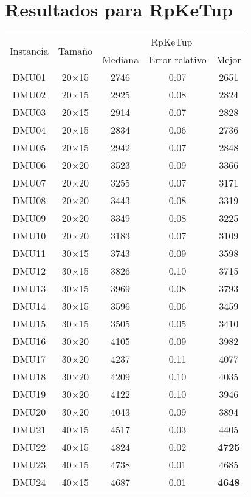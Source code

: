 \section{Resultados para RpKeTup}

\begin{table}[H]
\centering
\begin{tabular}{@{}ccccc@{}}
\toprule
\multirow{2}{*}{Instancia} & \multirow{2}{*}{Tamaño} & \multicolumn{3}{c}{RpKeTup} \\ \cmidrule(lr){3-5}
& & Mediana& Error relativo & Mejor  \\ \midrule
DMU01 & 20$\times$15 & 2746 & 0.07 & 2651\\ 
DMU02 & 20$\times$15 & 2925 & 0.08 & 2824\\ 
DMU03 & 20$\times$15 & 2914 & 0.07 & 2828\\ 
DMU04 & 20$\times$15 & 2834 & 0.06 & 2736\\ 
DMU05 & 20$\times$15 & 2942 & 0.07 & 2848\\ 
DMU06 & 20$\times$20 & 3523 & 0.09 & 3366\\ 
DMU07 & 20$\times$20 & 3255 & 0.07 & 3171\\ 
DMU08 & 20$\times$20 & 3443 & 0.08 & 3319\\ 
DMU09 & 20$\times$20 & 3349 & 0.08 & 3225\\ 
DMU10 & 20$\times$20 & 3183 & 0.07 & 3109\\ 
DMU11 & 30$\times$15 & 3743 & 0.09 & 3598\\ 
DMU12 & 30$\times$15 & 3826 & 0.10 & 3715\\ 
DMU13 & 30$\times$15 & 3969 & 0.08 & 3793\\ 
DMU14 & 30$\times$15 & 3596 & 0.06 & 3459\\ 
DMU15 & 30$\times$15 & 3505 & 0.05 & 3410\\ 
DMU16 & 30$\times$20 & 4105 & 0.09 & 3982\\ 
DMU17 & 30$\times$20 & 4237 & 0.11 & 4077\\ 
DMU18 & 30$\times$20 & 4209 & 0.10 & 4035\\ 
DMU19 & 30$\times$20 & 4122 & 0.10 & 3946\\ 
DMU20 & 30$\times$20 & 4043 & 0.09 & 3894\\ 
DMU21 & 40$\times$15 & 4517 & 0.03 & 4405\\ 
DMU22 & 40$\times$15 & 4824 & 0.02 & \textbf{4725}\\ 
DMU23 & 40$\times$15 & 4738 & 0.01 & 4685\\ 
DMU24 & 40$\times$15 & 4687 & 0.01 & \textbf{4648}\\ 

\end{tabular}
\end{table}
